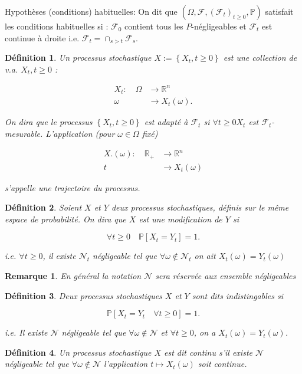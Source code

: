 \documentclass[A4paper,12pt]{report}
\newtheorem{definition}{D\'efinition}[chapter]
\newtheorem{remark}{Remarque}[chapter]
\newcommand{\pr}{{\mathbb{P}}}
\begin{document}
Hypothèses (conditions) habituelles: On dit que $\left(\Omega, \mathcal{F},\left(\mathcal{F}_{t}\right)_{t \geq 0}, \pr \right)$ satisfait les conditions habituelles si : $\mathcal{F}_{0}$ contient tous les $P$-négligeables et $\mathcal{F}_{t}$ est continue à droite i.e. $\mathcal{F}_{t}=\cap_{s>t} \mathcal{F}_{s}$.
 \begin{definition}
 Un processus stochastique $X:=\left\{X_{t}, t \geq 0\right\}$ est une collection de v.a. $X_{t}, t \geq 0$ :

$$
\begin{aligned}
X_{t}: \quad \Omega & \longrightarrow \mathbb{R}^{n} \\
\omega &\longrightarrow X_{t}(\omega) .
\end{aligned}
$$

On dira que le processus $\left\{X_{t}, t \geq 0\right\}$ est adapté à $\mathcal{F}_{t}$ si $\forall t \geq 0 X_{t}$ est $\mathcal{F}_{t}$-mesurable. L'application (pour $\omega \in \Omega$ fixé)

$$
\begin{aligned}
 X .(\omega): \quad \mathbb{R}_{+} &\longrightarrow \mathbb{R}^{n} \\
 t & \longrightarrow X_{t}(\omega)
\end{aligned}
$$

s'appelle une trajectoire du processus.
\end{definition}
\begin{definition}
 Soient $X$ et $Y$ deux processus stochastiques, définis sur le même espace de probabilité. On dira que $X$ est une modification de $Y$ si

$$
\forall t \geq 0 \quad \pr \left[X_{t}=Y_{t}\right]=1 .
$$

i.e. $\forall t \geq 0$, il existe $\mathcal{N}_{t}$ négligeable tel que $\forall \omega \notin \mathcal{N}_{t}$ on ait $X_{t}(\omega)=Y_{t}(\omega)$
\end{definition}

\begin{remark} 
En général la notation $\mathcal{N}$ sera réservée aux ensemble négligeables
\end{remark}

\begin{definition}  Deux processus stochastiques $X$ et $Y$ sont dits indistingables si

$$
\pr \left[X_{t}=Y_{t} \quad \forall t \geq 0\right]=1 .
$$

i.e. Il existe $\mathcal{N}$ négligeable tel que $\forall \omega \notin \mathcal{N}$ et $\forall t \geq 0$, on a $X_{t}(\omega)=Y_{t}(\omega)$.
\end{definition}
\begin{definition}
Un processus stochastique $X$ est dit continu s'il existe $\mathcal{N}$ négligeable tel que $\forall \omega \notin \mathcal{N}$ l'application $t \mapsto X_{t}(\omega)$ soit continue.
\end{definition}
\end{document}
